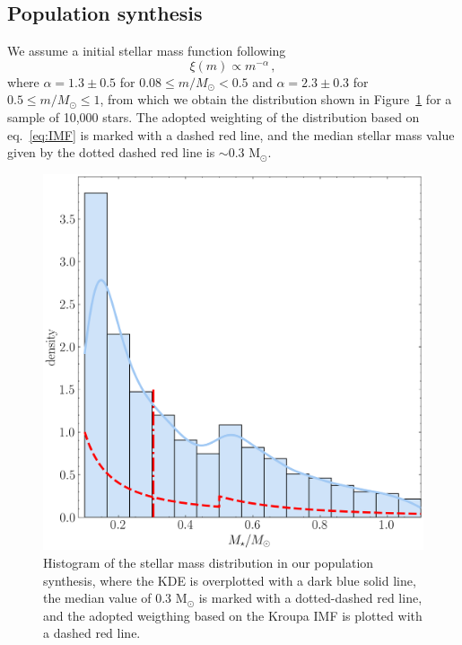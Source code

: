 \documentclass[fleqn,usenatbib,letters]{mnras}
\begin{document}


\subsection{Population synthesis}

We assume a initial stellar mass function following \citet{Kroupa2001}
\begin{equation} \label{eq:IMF}
    \xi(m) \propto m^{-\alpha} \,,
\end{equation}
where $\alpha = 1.3 \pm 0.5$ for $0.08 \leq m/M_\odot < 0.5$ and $\alpha = 2.3 \pm 0.3$ for $0.5 \leq m/M_\odot \leq 1$, from which we obtain the distribution shown in Figure~\ref{fig:stellar_masses} for a sample of 10,000 stars. The adopted weighting of the distribution based on eq.~\ref{eq:IMF} is marked with a dashed red line, and the median stellar mass value given by the dotted dashed red line is $\sim 0.3$ M$_\odot$.
\begin{figure}
    \includegraphics[width=\columnwidth]{Fig1}
    \caption{Histogram of the stellar mass distribution in our population synthesis, where the KDE is overplotted with a dark blue solid line, the median value of $0.3$ M$_\odot$ is marked with a dotted-dashed red line, and the adopted weigthing based on the Kroupa IMF is plotted with a dashed red line. \label{fig:stellar_masses}}
\end{figure}
\end{document}
